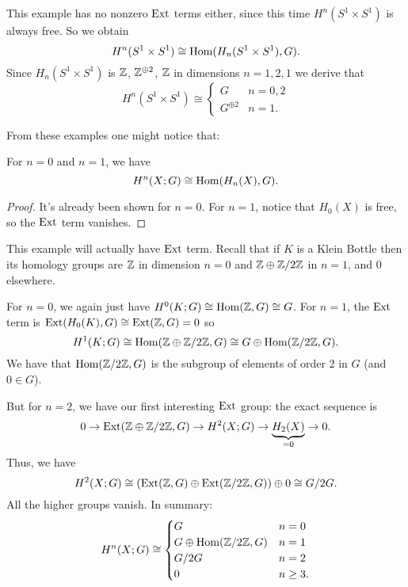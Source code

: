 \begin{example}
	This example has no nonzero $\operatorname{Ext}$ terms either,
	since this time $H^n(S^1 \times S^1)$ is always free.
	So we obtain
	\[ H^n(S^1 \times S^1) \cong \operatorname{Hom}(H_n(S^1 \times S^1), G). \]
	Since $H_n(S^1 \times S^1)$ is $\mathbb Z$, $\mathbb Z^{\oplus 2}$, $\mathbb Z$
	in dimensions $n=1,2,1$ we derive that
	\[
		H^n(S^1 \times S^1)
		\cong
		\begin{cases}
			G & n = 0,2 \\
			G^{\oplus 2} & n = 1.
		\end{cases}
	\]
\end{example}

From these examples one might notice that:
\begin{lemma}
	For $n = 0$ and $n = 1$, we have
	\[ H^n(X;G) \cong \operatorname{Hom}(H_n(X), G). \]
\end{lemma}
\begin{proof}
	It's already been shown for $n=0$.
	For $n=1$, notice that $H_0(X)$ is free,
	so the $\operatorname{Ext}$ term vanishes.
\end{proof}

\begin{example}
	This example will actually have $\operatorname{Ext}$ term.
	Recall that if $K$ is a Klein Bottle then its homology groups are
	$\mathbb Z$ in dimension $n=0$ and $\mathbb Z \oplus \mathbb Z/2\mathbb Z$ in $n=1$, and $0$ elsewhere.

	For $n=0$, we again just have $H^0(K;G) \cong \operatorname{Hom}(\mathbb Z, G) \cong G$.
	For $n=1$, the $\operatorname{Ext}$ term is $\operatorname{Ext}(H_0(K), G) \cong \operatorname{Ext}(\mathbb Z, G) = 0$
	so \[ H^1(K;G) \cong \operatorname{Hom}(\mathbb Z \oplus \mathbb Z/2\mathbb Z, G) \cong G \oplus \operatorname{Hom}(\mathbb Z/2\mathbb Z, G). \]
	We have that $\operatorname{Hom}(\mathbb Z/2\mathbb Z,G)$ is the subgroup
	of elements of order $2$ in $G$ (and $0 \in G$).

	But for $n=2$, we have our first interesting $\operatorname{Ext}$ group:
	the exact sequence is
	\[ 0 \to \operatorname{Ext}(\mathbb Z \oplus \mathbb Z/2\mathbb Z, G) \to H^2(X;G) \to \underbrace{H_2(X)}_{=0} \to 0. \]
	Thus, we have
	\[ H^2(X;G) \cong \left( \operatorname{Ext}(\mathbb Z,G) \oplus \operatorname{Ext}(\mathbb Z/2\mathbb Z,G) \right) \oplus 0
		\cong G/2G. \]
	All the higher groups vanish.
	In summary:
	\[
		H^n(X;G) \cong
		\begin{cases}
			G & n = 0 \\
			G \oplus \operatorname{Hom}(\mathbb Z/2\mathbb Z, G) & n = 1 \\
			G/2G & n = 2 \\
			0 & n \ge 3.
		\end{cases}
	\]
\end{example}


